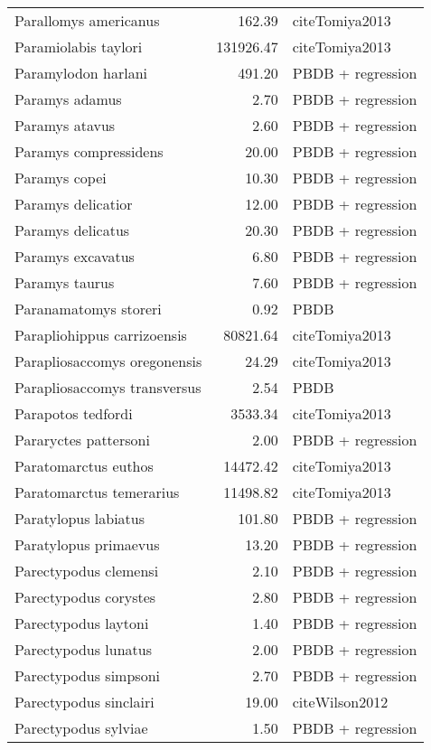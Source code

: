 \begin{table}[ht]
\begin{tabular}{lrl}
  Parallomys americanus & 162.39 & cite{Tomiya2013} \\ 
  Paramiolabis taylori & 131926.47 & cite{Tomiya2013} \\ 
  Paramylodon harlani & 491.20 & PBDB + regression \\ 
  Paramys adamus & 2.70 & PBDB + regression \\ 
  Paramys atavus & 2.60 & PBDB + regression \\ 
  Paramys compressidens & 20.00 & PBDB + regression \\ 
  Paramys copei & 10.30 & PBDB + regression \\ 
  Paramys delicatior & 12.00 & PBDB + regression \\ 
  Paramys delicatus & 20.30 & PBDB + regression \\ 
  Paramys excavatus & 6.80 & PBDB + regression \\ 
  Paramys taurus & 7.60 & PBDB + regression \\ 
  Paranamatomys storeri & 0.92 & PBDB \\ 
  Parapliohippus carrizoensis & 80821.64 & cite{Tomiya2013} \\ 
  Parapliosaccomys oregonensis & 24.29 & cite{Tomiya2013} \\ 
  Parapliosaccomys transversus & 2.54 & PBDB \\ 
  Parapotos tedfordi & 3533.34 & cite{Tomiya2013} \\ 
  Pararyctes pattersoni & 2.00 & PBDB + regression \\ 
  Paratomarctus euthos & 14472.42 & cite{Tomiya2013} \\ 
  Paratomarctus temerarius & 11498.82 & cite{Tomiya2013} \\ 
  Paratylopus labiatus & 101.80 & PBDB + regression \\ 
  Paratylopus primaevus & 13.20 & PBDB + regression \\ 
  Parectypodus clemensi & 2.10 & PBDB + regression \\ 
  Parectypodus corystes & 2.80 & PBDB + regression \\ 
  Parectypodus laytoni & 1.40 & PBDB + regression \\ 
  Parectypodus lunatus & 2.00 & PBDB + regression \\ 
  Parectypodus simpsoni & 2.70 & PBDB + regression \\ 
  Parectypodus sinclairi & 19.00 & cite{Wilson2012} \\ 
  Parectypodus sylviae & 1.50 & PBDB + regression \\ 

\end{tabular}
\end{table}
